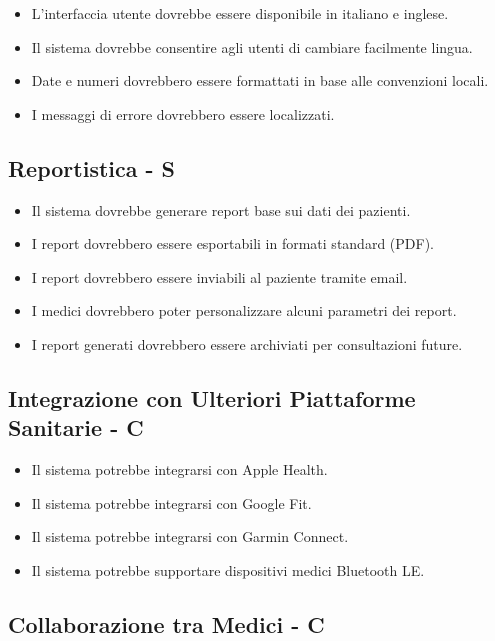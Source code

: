 \documentclass[12pt,a4paper,oneside]{report}
\begin{document}
\begin{itemize}
    \item L'interfaccia utente dovrebbe essere disponibile in italiano e inglese.
    \item Il sistema dovrebbe consentire agli utenti di cambiare facilmente lingua.
    \item Date e numeri dovrebbero essere formattati in base alle convenzioni locali.
    \item I messaggi di errore dovrebbero essere localizzati.
\end{itemize}

\subsection{Reportistica - S}

\begin{itemize}
    \item Il sistema dovrebbe generare report base sui dati dei pazienti.
    \item I report dovrebbero essere esportabili in formati standard (PDF).
    \item I report dovrebbero essere inviabili al paziente tramite email.
    \item I medici dovrebbero poter personalizzare alcuni parametri dei report.
    \item I report generati dovrebbero essere archiviati per consultazioni future.
\end{itemize}

\subsection{Integrazione con Ulteriori Piattaforme Sanitarie - C}

\begin{itemize}
    \item Il sistema potrebbe integrarsi con Apple Health.
    \item Il sistema potrebbe integrarsi con Google Fit.
    \item Il sistema potrebbe integrarsi con Garmin Connect.
    \item Il sistema potrebbe supportare dispositivi medici Bluetooth LE.
\end{itemize}

\subsection{Collaborazione tra Medici  - C}
\end{document}
